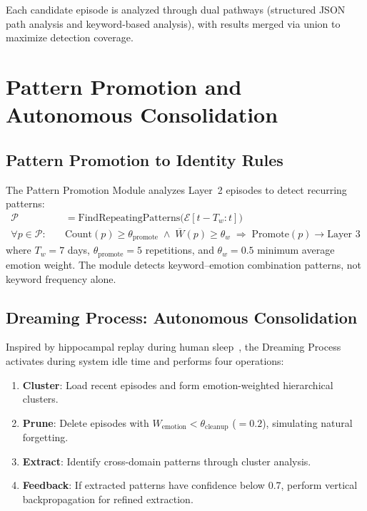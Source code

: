 \documentclass[11pt,a4paper]{article}
\begin{document}
Each candidate episode is analyzed through dual pathways (structured JSON path analysis and
keyword-based analysis), with results merged via union to maximize detection coverage.

\section{Pattern Promotion and Autonomous Consolidation}

\subsection{Pattern Promotion to Identity Rules}

The Pattern Promotion Module analyzes Layer~2 episodes to detect recurring patterns:
\begin{align}
  \mathcal{P} &= \text{FindRepeatingPatterns}\!\bigl(\mathcal{E}[t - T_w : t]\bigr) \\
  \forall p \in \mathcal{P}:\quad &
    \text{Count}(p) \ge \theta_{\text{promote}}
    \;\wedge\;
    \overline{W}(p) \ge \theta_w
    \;\Rightarrow\;
    \text{Promote}(p) \to \text{Layer~3}
\end{align}
where $T_w = 7$ days, $\theta_{\text{promote}} = 5$ repetitions, and $\theta_w = 0.5$
minimum average emotion weight. The module detects keyword--emotion combination patterns,
not keyword frequency alone.

\subsection{Dreaming Process: Autonomous Consolidation}

Inspired by hippocampal replay during human
sleep~\citep{walker2004sleep,diekelmann2010memory}, the Dreaming Process activates during
system idle time and performs four operations:

\begin{enumerate}[leftmargin=*, itemsep=2pt]
  \item \textbf{Cluster}: Load recent episodes and form emotion-weighted hierarchical
        clusters.
  \item \textbf{Prune}: Delete episodes with $W_{\text{emotion}} < \theta_{\text{cleanup}}$
        ($= 0.2$), simulating natural forgetting.
  \item \textbf{Extract}: Identify cross-domain patterns through cluster analysis.
  \item \textbf{Feedback}: If extracted patterns have confidence below 0.7, perform
        vertical backpropagation for refined extraction.
\end{enumerate}
\end{document}
